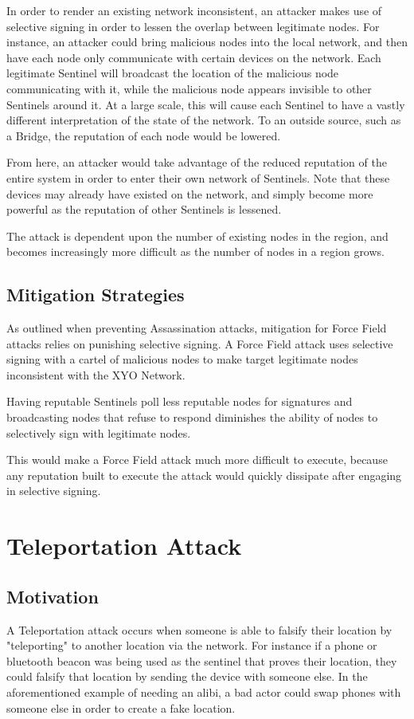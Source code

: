 \documentclass{article}
\begin{document}
In order to render an existing network inconsistent, an attacker makes use of selective signing in order to lessen the overlap between legitimate nodes. For instance, an attacker could bring malicious nodes into the local network, and then have each node only communicate with certain devices on the network. Each legitimate Sentinel will broadcast the location of the malicious node communicating with it, while the malicious node appears invisible to other Sentinels around it. At a large scale, this will cause each Sentinel to have a vastly different interpretation of the state of the network. To an outside source, such as a Bridge, the reputation of each node would be lowered.

From here, an attacker would take advantage of the reduced reputation of the entire system in order to enter their own network of Sentinels. Note that these devices may already have existed on the network, and simply become more powerful as the reputation of other Sentinels is lessened.

The attack is dependent upon the number of existing nodes in the region, and becomes increasingly more difficult as the number of nodes in a region grows.

\subsection{Mitigation Strategies}

As outlined when preventing Assassination attacks, mitigation for Force Field attacks relies on punishing selective signing. A Force Field attack uses selective signing with a cartel of malicious nodes to make target legitimate nodes inconsistent with the XYO Network. 

Having reputable Sentinels poll less reputable nodes for signatures and broadcasting nodes that refuse to respond diminishes the ability of nodes to selectively sign with legitimate nodes.

This would make a Force Field attack much more difficult to execute, because any reputation built to execute the attack would quickly dissipate after engaging in selective signing.

\section{Teleportation Attack}
\subsection{Motivation}
A Teleportation attack occurs when someone is able to falsify their location by "teleporting" to another location via the network. For instance if a phone or bluetooth beacon was being used as the sentinel that proves their location, they could falsify that location by sending the device with someone else. In the aforementioned example of needing an alibi, a bad actor could swap phones with someone else in order to create a fake location. 
\end{document}
